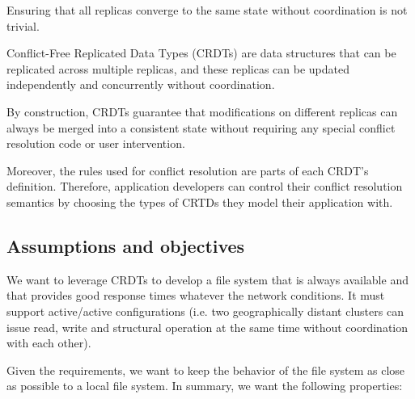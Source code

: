 \documentclass[sigconf,anonymous,10pt]{acmart}
\begin{document}
Ensuring that all replicas converge to the same state without coordination
is not trivial.

Conflict-Free Replicated Data Types (CRDTs) are data structures that
can be replicated across multiple replicas, and these replicas can be updated independently and concurrently without coordination.

By construction, CRDTs guarantee that modifications on different
replicas can always be merged into a consistent state without requiring
any special conflict resolution code or user intervention.

Moreover, the rules used for conflict resolution are parts of each CRDT's
definition.
Therefore, application developers can control their conflict resolution semantics by
choosing the types of CRTDs they model their application with.



\subsection{Assumptions and objectives}

We want to leverage CRDTs to develop a file system that is always available
and that provides good response times whatever the network conditions.
It must support active/active configurations
(i.e. two geographically distant clusters can issue read, write and structural
operation at the same time without coordination with each other).

Given the requirements, we want to keep the behavior of the file system as
close as possible to a local file system.
In summary, we want the following properties:
\end{document}
